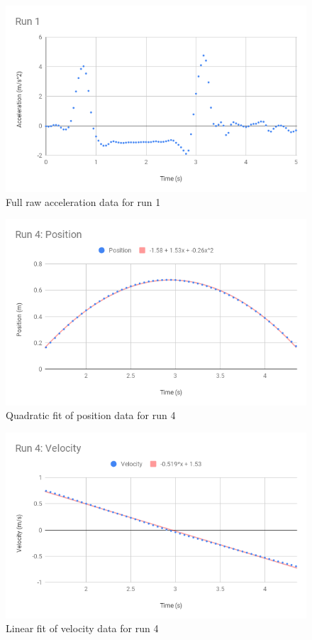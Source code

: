 \begin{figure}[ht]
    \centering
    \includegraphics[scale=0.71]{image/02-incline/Run1-a.png}
    \caption{Full raw acceleration data for run 1}
    \label{figure:02.raw.a}
\end{figure}
%
\begin{figure}[ht]
    \centering
    \includegraphics[scale=0.71]{image/02-incline/Run-4-d.png}
    \caption{Quadratic fit of position data for run 4}
    \label{figure:02.fit.d}
\end{figure}
%
\begin{figure}[ht]
    \centering
    \includegraphics[scale=0.71]{image/02-incline/Run-4-v.png}
    \caption{Linear fit of velocity data for run 4}
    \label{figure:02.fit.v}
\end{figure}
